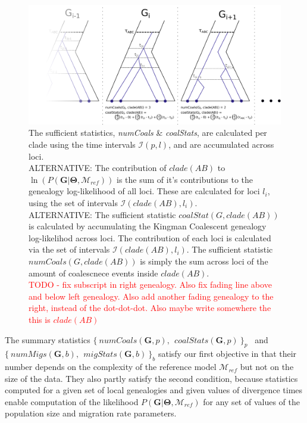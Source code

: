 \documentclass[11pt]{article}
\newcommand{\vect}[1]{\boldsymbol{\mathbf{#1}}}
\newcommand{\M}{\mathcal{M}}
\newcommand{\G}{\vect{G}}
\newcommand{\T}{\vect{\Theta}}
\newcommand{\Ip}{\mathcal{I}(p,l)}
\newcommand{\Mref}{\M_{ref}}
\newcommand{\1}{\mathbbm{1}}
\begin{document}
\begin{figure}[h]
\centering
\includegraphics[width=1.0\textwidth]
{multiple_loci}
\caption{The sufficient statistics, \textit{numCoals} \& \textit{coalStats}, are calculated per clade using the time intervals $\Ip$, and are accumulated across loci.\\
%
ALTERNATIVE: The contribution of $clade(AB)$ to $\ln \left( P(\G| \T,\Mref) \right)$ is the sum of it's contributions to the genealogy log-likelihood of all loci. These are calculated for loci $l_i$, using the set of intervals $\mathcal{I}(clade(AB),l_i)$.\\
%
ALTERNATIVE: The sufficient statistic $coalStat(G, clade(AB))$ is calculated by accumulating the Kingman Coalescent genealogy log-likelihod across loci. The contribution of each loci is calculated via the set of intervals $\mathcal{I}(clade(AB),l_i)$. The sufficient statistic $numCoals(G, clade(AB))$ is simply the sum across loci of the amount of coalescnece events inside $clade(AB)$.\\
%
\textcolor{red}{TODO - fix subscript in right genealogy. Also fix fading line above and below left genealogy. Also add another fading genealogy to the right, instead of the dot-dot-dot. Also maybe write somewhere the this is $clade(AB)$}}
\label{fig:multiple_loci}
\end{figure}


The summary statistics $\{~numCoals(\G,p),~~ coalStats(\G,p)~\}_p$~ and ~$\{~numMigs(\G,b),~~ migStats(\G,b)~\}_b$ satisfy our first objective in that their number depends on the complexity of the reference model $\Mref$ but not on the size of the data.
%
They also partly satisfy the second condition, because statistics computed for a given set of local genealogies and given values of divergence times enable computation of the likelihood $P(\G|\T,\Mref)$ for any set of values of the population size and migration rate parameters.
%
\end{document}

